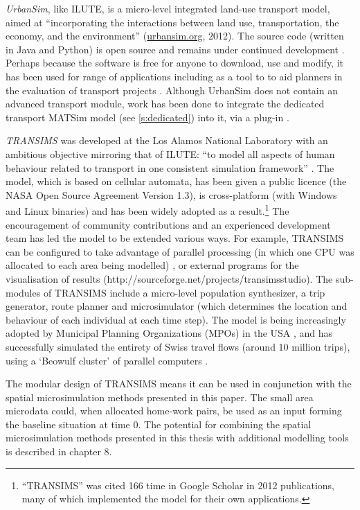 \emph{UrbanSim}, like ILUTE, is a micro-level integrated land-use transport
model, aimed at 
``incorporating the interactions between land use, transportation, the economy,
and the environment'' (\href{http://www.urbansim.org/Main/WebHome}{urbansim.org}, 2012).
The source code (written in Java and Python)
is open source and remains under continued development \citep{Waddell2003}.
Perhaps because the software is free for anyone to download, use and modify,
it has been used for range of applications including as a tool to
to aid planners in the evaluation of transport projects \citep{Borning2008}.
Although UrbanSim does not contain an advanced transport module,
work has been done to integrate the dedicated transport MATSim model (see
\cref{s:dedicated}) into it,
via a plug-in \citep{Nicolai2012-matsim}.

\emph{TRANSIMS}  was developed at the Los Alamos National
Laboratory with an
ambitious objective mirroring that of ILUTE:
``to model all aspects of human behaviour related to
transport in one consistent simulation framework''
\citep[p.~1]{nagel1999transims}.  The model, which is based on cellular
automata, has been given a public licence (the NASA Open Source Agreement
Version 1.3), is cross-platform (with Windows and Linux binaries) and has been
widely adopted as a result.\footnote{``TRANSIMS'' was cited 166 time in Google
Scholar in 2012 publications, many of which implemented the model for their own
applications.}
The encouragement of community contributions and an experienced development team
has led the model to be extended various ways. For example, TRANSIMS can be
configured to take advantage of parallel processing (in which one CPU was
allocated to each area being modelled) \citep{nagel2001parallel}, or external
programs for the visualisation of results
(http://sourceforge.net/projects/transimsstudio). The sub-modules of TRANSIMS
include a micro-level population synthesizer, a trip generator, route planner
and microsimulator (which determines the location and behaviour of each
individual at each time step). The model is being increasingly adopted by
Municipal Planning Organizations (MPOs) in the USA \citep{lawe2009transims,
ullah2011travel}, and has successfully simulated the entirety of Swiss travel
flows (around 10 million trips), using a `Beowulf cluster' of parallel computers
\citep{Raney2003}.

The modular design of TRANSIMS means it can be used in conjunction with the
spatial microsimulation methods presented in this paper. The small area
microdata could, when allocated home-work pairs, be used as an input forming
the baseline situation at time 0. The potential for combining the spatial
microsimulation methods presented in this thesis with additional modelling
tools is described in chapter 8.



